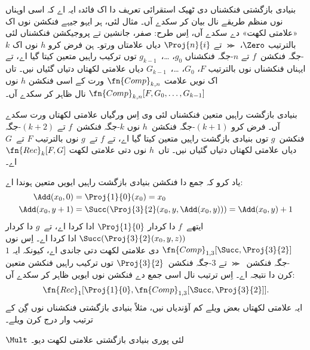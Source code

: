 \documentclass[../../../include/open-logic-section]{subfiles}
\begin{document}

بنیادی بازگشتی فنکشناں دی ٹھیک استقرائی تعریف
دا اک فائدہ ایہ اے کہ اسی اوہناں نوں
منظم طریقے نال بیان کر سکدے آں۔ مثال لئی،
ہر ایہو جیہے فنکشن نوں اک «علامتی لکھت»
دے سکدے آں، اِس طرح: صفر، جانشین تے
پروجیکشن فنکشناں لئی بالترتیب $\Zero$،
$\Succ$ تے $\Proj{n}{i}$ دیاں علامتاں
ورتو۔ ہن فرض کرو $h$ نوں اک $k$-جگہ
فنکشن~$f$ تے $n$-جگہ فنکشناں $g_0$،
\dots،~$g_{k-1}$ توں ترکیب راہیں
متعین کیتا گیا اے، تے ایہناں فنکشناں نوں
بالترتیب $F$، $G_0$، \dots،~$G_{k-1}$
دیاں علامتی لکھتاں دتیاں گئیاں نیں۔
تاں اک نویں علامت $\fn{Comp}_{k,n}$
ورت کے اسی فنکشن $h$ نوں
$\fn{Comp}_{k,n}[F,G_0,\dots,G_{k-1}]$
نال ظاہر کر سکدے آں۔

بنیادی بازگشت راہیں متعین فنکشناں لئی
وی اِس ورگیاں علامتی لکھتاں ورت سکدے
آں۔ فرض کرو $(k+1)$-جگہ فنکشن~$h$
نوں $k$-جگہ فنکشن~$f$ تے
$(k+2)$-جگہ فنکشن~$g$ توں بنیادی
بازگشت راہیں متعین کیتا گیا اے،
تے $f$ تے~$g$ نوں بالترتیب $F$
تے~$G$ دیاں علامتی لکھتاں دتیاں
گئیاں نیں۔ تاں~$h$ نوں دتی
علامتی لکھت $\fn{Rec}_k[F,G]$ اے۔

یاد کرو کہ جمع دا فنکشن بنیادی بازگشت
راہیں ایویں متعین ہوندا اے:
\begin{align*}
  \Add(x_0, 0) & = \Proj{1}{0}(x_0) = x_0\\
  \Add(x_0, y+1) & = \Succ(\Proj{3}{2}(x_0, y, \Add(x_0, y))) = \Add(x_0, y) +1
\end{align*}
ایتھے~$f$ دا کردار $\Proj{1}{0}$
ادا کردا اے، تے~$g$ دا کردار
$\Succ(\Proj{3}{2}(x_0, y, z))$
ادا کردا اے۔ اِس نوں
$\fn{Comp}_{1,3}[\Succ,\Proj{3}{2}]$
دی علامتی لکھت دتی جاندی اے، کیونکہ
ایہ $1$-جگہ فنکشن~$\Succ$ تے
$3$-جگہ فنکشن~$\Proj{3}{2}$ توں
ترکیب راہیں فنکشن متعین کرن دا نتیجہ
اے۔ اِس ترتیب نال اسی جمع دے فنکشن
نوں ایویں ظاہر کر سکدے آں:
\[
\fn{Rec}_1[\Proj{1}{0},\fn{Comp}_{1,3}[\Succ,\Proj{3}{2}]].
\]
ایہ علامتی لکھتاں بعض ویلے کم آؤندیاں
نیں، مثلاً بنیادی بازگشتی فنکشناں نوں
گِن کے ترتیب وار درج کرن ویلے۔

\begin{prob}
  $\Mult$ لئی پوری بنیادی بازگشتی علامتی لکھت دیو۔
\end{prob}
\end{document}
